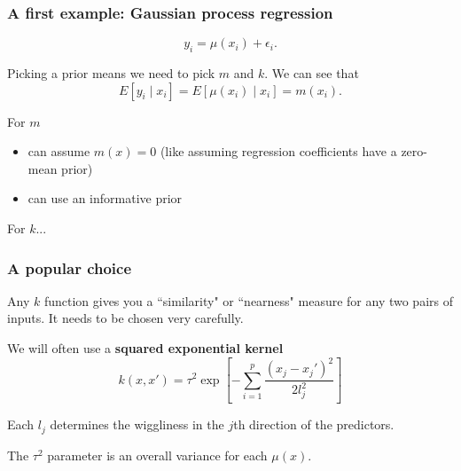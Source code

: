 \documentclass{beamer}
\begin{document}
\begin{frame}
\frametitle{A first example: Gaussian process regression}

$$
y_i = \mu(x_i) + \epsilon_i.
$$

Picking a prior means we need to pick $m$ and $k$. We can see that 
$$
E[y_i \mid x_i] = E[\mu(x_i) \mid x_i] = m(x_i).
$$

For $m$
\begin{itemize}
\item can assume $m(x) = 0$ (like assuming regression coefficients have a zero-mean prior)
\item can use an informative prior
\end{itemize}

For $k$...

\end{frame}

\begin{frame}
\frametitle{A popular choice}

Any $k$ function gives you a ``similarity" or ``nearness" measure for any two pairs of inputs. It needs to be chosen very carefully. 
\newline


We will often use a {\bf squared exponential kernel} 
$$
k(x,x') = \tau^2 \exp\left[-\sum_{i=1}^p \frac{ (x_j - x_j')^2 }{2 l_j^2} \right]
$$ 

Each $l_j$ determines the wiggliness in the $j$th direction of the predictors.
\newline

The $\tau^2$ parameter is an overall variance for each $\mu(x)$.
\newline


\end{frame}
\end{document}
